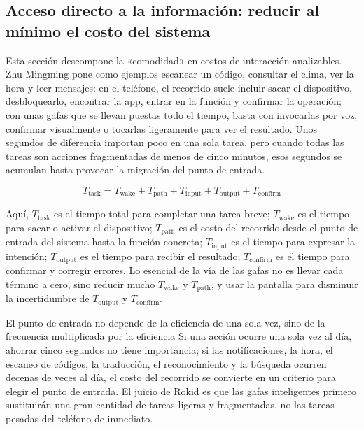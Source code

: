 \subsection{Acceso directo a la información: reducir al mínimo el costo del sistema}

Esta sección descompone la «comodidad» en costos de interacción analizables. Zhu Mingming pone como ejemplos escanear un código, consultar el clima, ver la hora y leer mensajes: en el teléfono, el recorrido suele incluir sacar el dispositivo, desbloquearlo, encontrar la app, entrar en la función y confirmar la operación; con unas gafas que se llevan puestas todo el tiempo, basta con invocarlas por voz, confirmar visualmente o tocarlas ligeramente para ver el resultado. Unos segundos de diferencia importan poco en una sola tarea, pero cuando todas las tareas son acciones fragmentadas de menos de cinco minutos, esos segundos se acumulan hasta provocar la migración del punto de entrada.

\[
T_{\text{task}} = T_{\text{wake}} + T_{\text{path}} + T_{\text{input}} + T_{\text{output}} + T_{\text{confirm}}
\]

Aquí, $T_{\text{task}}$ es el tiempo total para completar una tarea breve; $T_{\text{wake}}$ es el tiempo para sacar o activar el dispositivo; $T_{\text{path}}$ es el costo del recorrido desde el punto de entrada del sistema hasta la función concreta; $T_{\text{input}}$ es el tiempo para expresar la intención; $T_{\text{output}}$ es el tiempo para recibir el resultado; $T_{\text{confirm}}$ es el tiempo para confirmar y corregir errores. Lo esencial de la vía de las gafas no es llevar cada término a cero, sino reducir mucho $T_{\text{wake}}$ y $T_{\text{path}}$, y usar la pantalla para disminuir la incertidumbre de $T_{\text{output}}$ y $T_{\text{confirm}}$.

\begin{importantbox}{El punto de entrada no depende de la eficiencia de una sola vez, sino de la frecuencia multiplicada por la eficiencia}
Si una acción ocurre una sola vez al día, ahorrar cinco segundos no tiene importancia; si las notificaciones, la hora, el escaneo de códigos, la traducción, el reconocimiento y la búsqueda ocurren decenas de veces al día, el costo del recorrido se convierte en un criterio para elegir el punto de entrada. El juicio de Rokid es que las gafas inteligentes primero sustituirán una gran cantidad de tareas ligeras y fragmentadas, no las tareas pesadas del teléfono de inmediato.
\end{importantbox}

